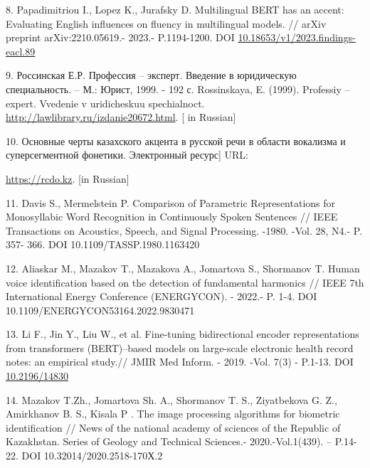 \begin{references}
8. Papadimitriou I., Lopez K., Jurafsky D. Multilingual BERT has an
accent: Evaluating English influences on fluency in multilingual models.
// arXiv preprint arXiv:2210.05619.- 2023.- P.1194-1200. DOI
\href{https://doi.org/10.18653/v1/2023.findings-eacl.89}{10.18653/v1/2023.findings-eacl.89}

9. Россинская Е.Р. Профессия -- эксперт. Введение в юридическую
специальность. -- М.: Юрист, 1999. - 192 с. Rossinskaya, E. (1999).
Professiy -- expert. Vvedenie v uridicheskuu spechialnoct.
\url{http://lawlibrary.ru/izdanie20672.html}. {[} in Russian{]}

10. Основные черты казахского акцента в русской речи в области вокализма
и суперсегментной фонетики. Электронный ресурс{]} URL:

\href{https://rcdo.kz/publ/9555-osnovnye-cherty-kazahskogo-akcenta-v-russkoy-rechi-v-oblasti-vokalizma-i-supersegmentnoy-fonetiki.html}{https://rcdo.kz}.
{[}in Russian{]}

11. Davis S., Mermelstein P. Comparison of Parametric Representations
for Monosyllabic Word Recognition in Continuously Spoken Sentences //
IEEE Transactions on Acoustics, Speech, and Signal Processing. -1980.
-Vol. 28, N4.- P. 357- 366. DOI 10.1109/TASSP.1980.1163420

12. Aliaskar M., Mazakov T., Mazakova A., Jomartova S., Shormanov T.
Human voice identification based on the detection of fundamental
harmonics // IEEE 7th International Energy Conference (ENERGYCON). -
2022.- P. 1-4. DOI 10.1109/ENERGYCON53164.2022.9830471

13. Li F., Jin Y., Liu W., et al. Fine-tuning bidirectional encoder
representations from transformers (BERT)--based models on large-scale
electronic health record notes: an empirical study.// JMIR Med Inform. -
2019. -Vol. 7(3) - P.1-13. DOI
\href{https://doi.org/10.2196/14830}{10.2196/14830}

14. Mazakov T.Zh., Jomartova Sh. A., Shormanov T. S., Ziyatbekova G. Z.,
Amirkhanov B. S., Kisala P . The image processing algorithms for
biometric identification // News of the national academy of sciences of
the Republic of Kazakhstan. Series of Geology and Technical Sciences.-
2020.-Vol.1(439). -- P.14-22. DOI 10.32014/2020.2518-170Х.2
\end{references}

